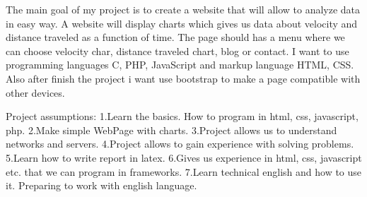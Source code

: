 The main goal of my project is to create a website that will allow to analyze data in easy way. A website will display charts which gives us data about velocity and distance traveled as a function of time.
The page should has a menu where we can choose velocity char, distance traveled chart, blog or contact. I want to use programming languages C, PHP, JavaScript and markup language HTML, CSS. Also after finish the project i want use bootstrap to make a page compatible with other devices.

Project assumptions:\newline
1.Learn the basics. How to program in html, css, javascript, php.\newline
2.Make simple WebPage with charts.\newline
3.Project allows us to understand networks and servers.\newline
4.Project allows to gain experience with solving problems.\newline
5.Learn how to write report in latex.\newline
6.Gives us experience in html, css, javascript etc. that we can program in frameworks.\newline
7.Learn technical english and how to use it. Preparing to work with english language. \newline